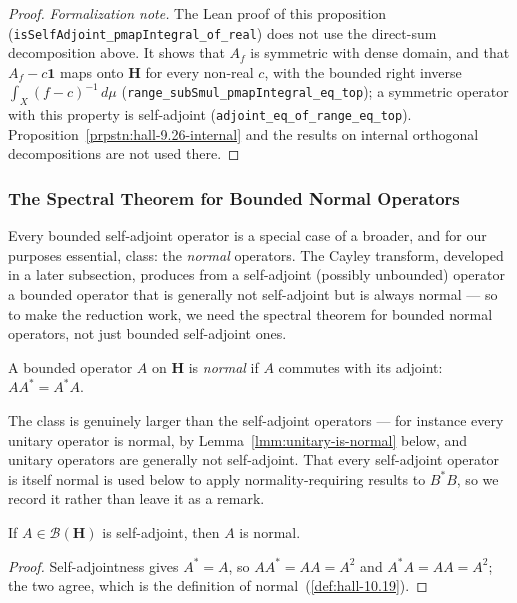 \begin{proof}
\noindent\textit{Formalization note.} The Lean proof of this proposition (\texttt{isSelfAdjoint\_pmapIntegral\_of\_real}) does not use the direct-sum decomposition above. It shows that $A_f$ is symmetric with dense domain, and that $A_f - c\mathbf{1}$ maps onto $\mathbf{H}$ for every non-real $c$, with the bounded right inverse $\int_X (f-c)^{-1}\,d\mu$ (\texttt{range\_subSmul\_pmapIntegral\_eq\_top}); a symmetric operator with this property is self-adjoint (\texttt{adjoint\_eq\_of\_range\_eq\_top}). Proposition~\ref{prpstn:hall-9.26-internal} and the results on internal orthogonal decompositions are not used there.
\end{proof}

\subsubsection{The Spectral Theorem for Bounded Normal Operators}
Every bounded self-adjoint operator is a special case of a broader, and for our purposes essential, class: the \textit{normal} operators. The Cayley transform, developed in a later subsection, produces from a self-adjoint (possibly unbounded) operator a bounded operator that is generally not self-adjoint but is always normal — so to make the reduction work, we need the spectral theorem for bounded normal operators, not just bounded self-adjoint ones.

\begin{definition}
    \label{def:hall-10.19}
    \leanok
    A bounded operator $A$ on $\mathbf{H}$ is \textit{normal} if $A$ commutes with its adjoint: $AA^* = A^*A$.
\end{definition}

The class is genuinely larger than the self-adjoint operators — for instance every unitary operator is normal, by Lemma~\ref{lmm:unitary-is-normal} below, and unitary operators are generally not self-adjoint. That every self-adjoint operator is itself normal is used below to apply normality-requiring results to $B^*B$, so we record it rather than leave it as a remark.

\begin{lemma}
    \label{lmm:self-adjoint-is-normal}
    \leanok
    If $A \in \mathcal{B}(\mathbf{H})$ is self-adjoint, then $A$ is normal.
\end{lemma}
\begin{proof}
    \leanok
Self-adjointness gives $A^* = A$, so $AA^* = AA = A^2$ and $A^*A = AA = A^2$; the two agree, which is the definition of normal~(\ref{def:hall-10.19}).
\end{proof}

